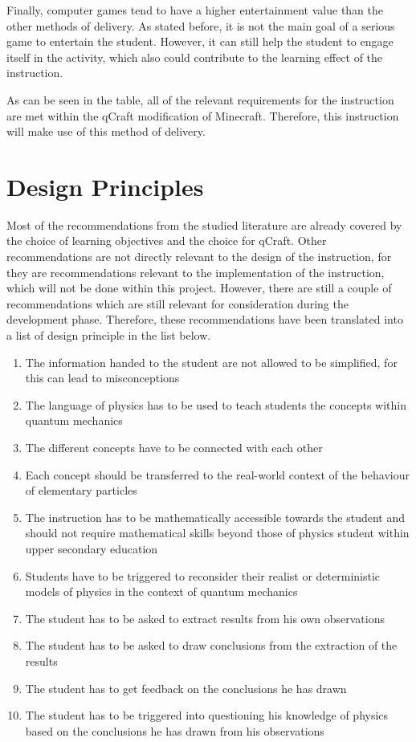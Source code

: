 \documentclass[11pt,twoside]{report} %
\begin{document}
Finally, computer games tend to have a higher entertainment value than the other methods of delivery. As stated before, it is not the main goal of a serious game to entertain the student. However, it can still help the student to engage itself in the activity, which also could contribute to the learning effect of the instruction.

As can be seen in the table, all of the relevant requirements for the instruction are met within the qCraft modification of Minecraft. Therefore, this instruction will make use of this method of delivery.

\section{Design Principles}
\label{ch:designprinciples}

Most of the recommendations from the studied literature are already covered by the choice of learning objectives and the choice for qCraft. Other recommendations are not directly relevant to the design of the instruction, for they are recommendations relevant to the implementation of the instruction, which will not be done within this project. However, there are still a couple of recommendations which are still relevant for consideration during the development phase. Therefore, these recommendations have been translated into a list of design principle in the list below.

\begin{enumerate}
\item \label{itm:simple}The information handed to the student are not allowed to be simplified, for this can lead to misconceptions
\item \label{itm:language} The language of physics has to be used to teach students the concepts within quantum mechanics
\item \label{itm:links}The different concepts have to be connected with each other
\item \label{itm:realworld}Each concept should be transferred to the real-world context of the behaviour of elementary particles
\item \label{itm:maths}The instruction has to be mathematically accessible towards the student and should not require mathematical skills beyond those of physics student within upper secondary education
\item \label{itm:models}Students have to be triggered to reconsider their realist or deterministic models of physics in the context of quantum mechanics
\item \label{itm:results}The student has to be asked to extract results from his own observations
\item \label{itm:conclusions}The student has to be asked to draw conclusions from the extraction of the results
\item \label{itm:feedback}The student has to get feedback on the conclusions he has drawn
\item \label{itm:critic}The student has to be triggered into questioning his knowledge of physics based on the conclusions he has drawn from his observations
\end{enumerate}
\end{document}
